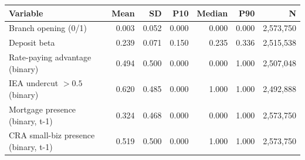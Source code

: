 \begin{tabular}{lrrrrrr}
\toprule
Variable & Mean & SD & P10 & Median & P90 & N \\
\midrule
Branch opening (0/1) & 0.003 & 0.052 & 0.000 & 0.000 & 0.000 & 2,573,750 \\
Deposit beta & 0.239 & 0.071 & 0.150 & 0.235 & 0.336 & 2,515,538 \\
Rate-paying advantage (binary) & 0.494 & 0.500 & 0.000 & 0.000 & 1.000 & 2,507,048 \\
IEA undercut $> 0.5$ (binary) & 0.620 & 0.485 & 0.000 & 1.000 & 1.000 & 2,492,888 \\
Mortgage presence (binary, t-1) & 0.324 & 0.468 & 0.000 & 0.000 & 1.000 & 2,573,750 \\
CRA small-biz presence (binary, t-1) & 0.519 & 0.500 & 0.000 & 1.000 & 1.000 & 2,573,750 \\
\bottomrule
\end{tabular}

